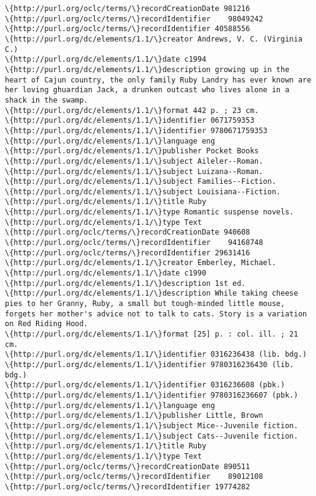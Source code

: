 \documentclass[11pt]{article}
\begin{document}
\begin{Verbatim}[commandchars=\\\{\}]
\{http://purl.org/oclc/terms/\}recordCreationDate 981216
\{http://purl.org/oclc/terms/\}recordIdentifier    98049242 
\{http://purl.org/oclc/terms/\}recordIdentifier 40588556
\{http://purl.org/dc/elements/1.1/\}creator Andrews, V. C. (Virginia C.)
\{http://purl.org/dc/elements/1.1/\}date c1994
\{http://purl.org/dc/elements/1.1/\}description growing up in the heart of Cajun country, the only family Ruby Landry has ever known are her loving ghuardian Jack, a drunken outcast who lives alone in a shack in the swamp.
\{http://purl.org/dc/elements/1.1/\}format 442 p. ; 23 cm.
\{http://purl.org/dc/elements/1.1/\}identifier 0671759353
\{http://purl.org/dc/elements/1.1/\}identifier 9780671759353
\{http://purl.org/dc/elements/1.1/\}language eng
\{http://purl.org/dc/elements/1.1/\}publisher Pocket Books
\{http://purl.org/dc/elements/1.1/\}subject Aileler--Roman.
\{http://purl.org/dc/elements/1.1/\}subject Luizana--Roman.
\{http://purl.org/dc/elements/1.1/\}subject Families--Fiction.
\{http://purl.org/dc/elements/1.1/\}subject Louisiana--Fiction.
\{http://purl.org/dc/elements/1.1/\}title Ruby 
\{http://purl.org/dc/elements/1.1/\}type Romantic suspense novels.
\{http://purl.org/dc/elements/1.1/\}type Text
\{http://purl.org/oclc/terms/\}recordCreationDate 940608
\{http://purl.org/oclc/terms/\}recordIdentifier    94168748 
\{http://purl.org/oclc/terms/\}recordIdentifier 29631416
\{http://purl.org/dc/elements/1.1/\}creator Emberley, Michael.
\{http://purl.org/dc/elements/1.1/\}date c1990
\{http://purl.org/dc/elements/1.1/\}description 1st ed.
\{http://purl.org/dc/elements/1.1/\}description While taking cheese pies to her Granny, Ruby, a small but tough-minded little mouse, forgets her mother's advice not to talk to cats. Story is a variation on Red Riding Hood.
\{http://purl.org/dc/elements/1.1/\}format [25] p. : col. ill. ; 21 cm.
\{http://purl.org/dc/elements/1.1/\}identifier 0316236438 (lib. bdg.) 
\{http://purl.org/dc/elements/1.1/\}identifier 9780316236430 (lib. bdg.)
\{http://purl.org/dc/elements/1.1/\}identifier 0316236608 (pbk.)
\{http://purl.org/dc/elements/1.1/\}identifier 9780316236607 (pbk.)
\{http://purl.org/dc/elements/1.1/\}language eng
\{http://purl.org/dc/elements/1.1/\}publisher Little, Brown
\{http://purl.org/dc/elements/1.1/\}subject Mice--Juvenile fiction.
\{http://purl.org/dc/elements/1.1/\}subject Cats--Juvenile fiction.
\{http://purl.org/dc/elements/1.1/\}title Ruby 
\{http://purl.org/dc/elements/1.1/\}type Text
\{http://purl.org/oclc/terms/\}recordCreationDate 890511
\{http://purl.org/oclc/terms/\}recordIdentifier    89012108 
\{http://purl.org/oclc/terms/\}recordIdentifier 19774282

\end{Verbatim}
\end{document}

